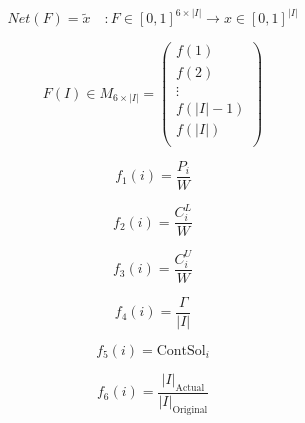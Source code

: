 \documentclass[spanish, a4paper, 12pt, openany,final]{book}
\begin{document}
\begin{equation}
	\label{eq:net_matrix}
	Net(F) = \tilde{x}\quad: F\in [0,1]^{6\times |I|} \rightarrow x \in[0,1]^{|I|}
\end{equation}

\begin{equation}
	F(I) \in M_{6 \times |I|} = 
	\left( 
	\begin{matrix}
		f(1)\\
		f(2)\\
		\vdots \\
		f(|I|-1)\\
		f(|I|)\\
	\end{matrix}
	\right)
	\label{eq:feature_matrix}
\end{equation}


\begin{multicols}{2}
	\label{eq:all_features}
	\begin{equation}
		f_1\left(i\right)   = \frac{P_i}{W}
		\label{feature:1}
	\end{equation}
	
	\begin{equation}
		f_2\left(i\right)   = \frac{C^L_i}{W}
		\label{feature:2}
	\end{equation}
	
	\begin{equation}
		f_3\left(i\right)   = \frac{C^U_i}{W}
		\label{feature:3}
	\end{equation}
	
	\begin{equation}
		f_4\left(i\right)   = \frac{\Gamma}{|I|}
		\label{feature:4}
	\end{equation}
	
	\begin{equation}
		f_5\left(i\right)   = \text{ContSol}_i
		\label{feature:5}
	\end{equation}
	
\begin{equation}
	\label{feature:6}
	f_6(i) = \frac{|I|_{\text{Actual}}}{|I|_\text{Original}}
\end{equation}	
\end{multicols}
\end{document}
